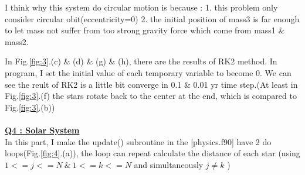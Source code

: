 \documentclass{article}
\begin{document}
I think why this system do circular motion is because : 1. this problem only consider circular obit(eccentricity=0)
2. the initial position of mass3 is far enough to let mass not suffer from too  strong gravity force which come from mass1 \& mass2.

In Fig.\ref{fig:3}.(c) \& (d) \& (g) \& (h), there are the results of RK2 method.
In program, I set the initial value of each temporary variable to become 0. We can see the reult of RK2 is a little bit converge in 0.1 \& 0.01 yr time step.(At least in Fig.\ref{fig:3}.(f) the stars rotate back to the center at the end, which is compared to  Fig.\ref{fig:3}.(b))
\\ \\
\underline{\textbf{Q4 : Solar System}}\\
In this part, I make the update() subroutine in the [physics.f90] have 2 do loops(Fig.\ref{fig:4}.(a)), the loop can repeat calculate the distance of each star (using $1<=j<=N \ \& \ 1<=k<=N$ and simultaneously $j\neq k$ )
\end{document}
